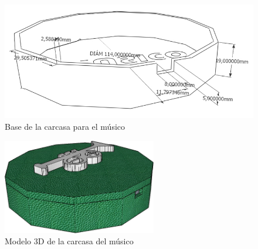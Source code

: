 \begin{figure}[!htb]
\centering
\includegraphics[width=1\textwidth]{./imagenes/carcasa_base_musico}
\caption{Base de la carcasa para el músico} \label{fig:carcasa_base_musico}
\end{figure}


\begin{figure}[!htb]
\centering
\includegraphics[width=0.6\textwidth]{./imagenes/carcasa_modelo_musico}
\caption{Modelo 3D de la carcasa del músico} \label{fig:carcasa_musico}
\end{figure}

